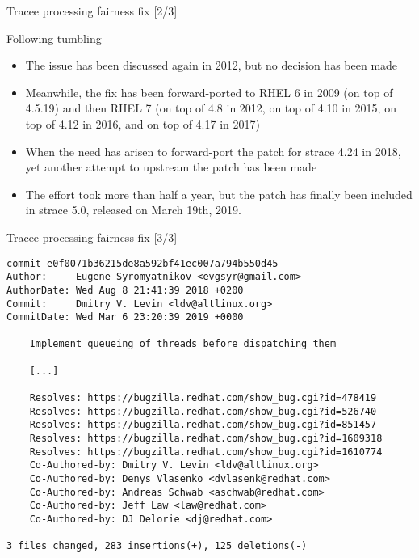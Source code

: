 \documentclass[unicode,aspectratio=169]{beamer}
\begin{document}

\begin{frame}{Tracee processing fairness fix \hfill [2/3]}
\begin{block}{\large Following tumbling}
\begin{itemize}
  \item The issue has been discussed again in 2012\footnotemark[1],
        but no decision has been made
  \item Meanwhile, the fix has been forward-ported to RHEL 6
        in 2009 (on top of 4.5.19) and then RHEL 7 (on top of 4.8 in 2012,
        on top of 4.10 in 2015, on top of 4.12 in 2016, and on top of 4.17
        in 2017)
  \item When the need has arisen to forward-port the patch for strace 4.24
        in 2018, yet another attempt to upstream the patch has been made
  \item The effort took more than half a year, but the patch has finally
        been included in strace 5.0, released on March 19th, 2019.
\end{itemize}
\end{block}
\end{frame}

\begin{frame}[fragile]{Tracee processing fairness fix \hfill [3/3]}
\begin{block}{}
\begin{scriptsize}
\begin{verbatim}
commit e0f0071b36215de8a592bf41ec007a794b550d45
Author:     Eugene Syromyatnikov <evgsyr@gmail.com>
AuthorDate: Wed Aug 8 21:41:39 2018 +0200
Commit:     Dmitry V. Levin <ldv@altlinux.org>
CommitDate: Wed Mar 6 23:20:39 2019 +0000

    Implement queueing of threads before dispatching them
    
    [...]
    
    Resolves: https://bugzilla.redhat.com/show_bug.cgi?id=478419
    Resolves: https://bugzilla.redhat.com/show_bug.cgi?id=526740
    Resolves: https://bugzilla.redhat.com/show_bug.cgi?id=851457
    Resolves: https://bugzilla.redhat.com/show_bug.cgi?id=1609318
    Resolves: https://bugzilla.redhat.com/show_bug.cgi?id=1610774
    Co-Authored-by: Dmitry V. Levin <ldv@altlinux.org>
    Co-Authored-by: Denys Vlasenko <dvlasenk@redhat.com>
    Co-Authored-by: Andreas Schwab <aschwab@redhat.com>
    Co-Authored-by: Jeff Law <law@redhat.com>
    Co-Authored-by: DJ Delorie <dj@redhat.com>

3 files changed, 283 insertions(+), 125 deletions(-)
\end{verbatim}
\end{scriptsize}
\end{block}
\end{frame}
\end{document}
